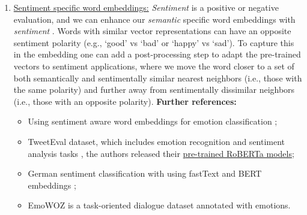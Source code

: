 \documentclass[11pt, a4paper]{amsart}
\begin{document}
\begin{enumerate}[resume]
    \item \underline{Sentiment specific word embeddings:}
    \newline
    \emph{Sentiment} is a positive or negative evaluation, and we can enhance our \emph{semantic} specific word embeddings with \emph{sentiment} \cite{yu-etal-2017-refining}.
    Words with similar vector representations can have an opposite sentiment polarity (e.g., `good' vs `bad' or `happy' vs `sad').
    To capture this in the embedding one can add a post-processing step to adapt the pre-trained vectors to sentiment applications,
    where we move the word closer to a set of both semantically and sentimentally similar nearest neighbors (i.e., those with the same polarity) and further away from sentimentally dissimilar neighbors (i.e., those with an opposite polarity).
    \newline
    \textbf{Further references:}
    \begin{itemize}
        \item Using sentiment aware word embeddings for emotion classification \cite{sentiment-aware-word-embedding-emotion-2019};
        \item TweetEval dataset, which includes emotion recognition and sentiment analysis tasks \cite{barbieri-etal-2020-tweeteval}, the authors released their \href{https://huggingface.co/cardiffnlp/twitter-roberta-base-sentiment}{pre-trained RoBERTa models};
        \item German sentiment classification with using fastText and BERT embeddings \cite{guhr-etal-2020-training};
        \item EmoWOZ \cite{DBLP:journals/corr/abs-2109-04919} is a task-oriented dialogue dataset annotated with emotions.
    \end{itemize}
    

\end{enumerate}
\end{document}
